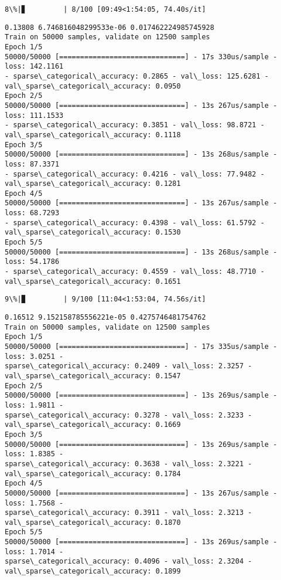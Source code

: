 \documentclass[11pt]{article}
\begin{document}
    \begin{Verbatim}[commandchars=\\\{\}]
  8\%|▊         | 8/100 [09:49<1:54:05, 74.40s/it]
    \end{Verbatim}

    \begin{Verbatim}[commandchars=\\\{\}]
0.13808 6.746816048299533e-06 0.017462224985745928
Train on 50000 samples, validate on 12500 samples
Epoch 1/5
50000/50000 [==============================] - 17s 330us/sample - loss: 142.1161
- sparse\_categorical\_accuracy: 0.2865 - val\_loss: 125.6281 -
val\_sparse\_categorical\_accuracy: 0.0950
Epoch 2/5
50000/50000 [==============================] - 13s 267us/sample - loss: 111.1533
- sparse\_categorical\_accuracy: 0.3851 - val\_loss: 98.8721 -
val\_sparse\_categorical\_accuracy: 0.1118
Epoch 3/5
50000/50000 [==============================] - 13s 268us/sample - loss: 87.3371
- sparse\_categorical\_accuracy: 0.4216 - val\_loss: 77.9482 -
val\_sparse\_categorical\_accuracy: 0.1281
Epoch 4/5
50000/50000 [==============================] - 13s 267us/sample - loss: 68.7293
- sparse\_categorical\_accuracy: 0.4398 - val\_loss: 61.5792 -
val\_sparse\_categorical\_accuracy: 0.1530
Epoch 5/5
50000/50000 [==============================] - 13s 268us/sample - loss: 54.1786
- sparse\_categorical\_accuracy: 0.4559 - val\_loss: 48.7710 -
val\_sparse\_categorical\_accuracy: 0.1651
    \end{Verbatim}

    \begin{Verbatim}[commandchars=\\\{\}]
  9\%|▉         | 9/100 [11:04<1:53:04, 74.56s/it]
    \end{Verbatim}

    \begin{Verbatim}[commandchars=\\\{\}]
0.16512 9.152158785556221e-05 0.4275746481754762
Train on 50000 samples, validate on 12500 samples
Epoch 1/5
50000/50000 [==============================] - 17s 335us/sample - loss: 3.0251 -
sparse\_categorical\_accuracy: 0.2409 - val\_loss: 2.3257 -
val\_sparse\_categorical\_accuracy: 0.1547
Epoch 2/5
50000/50000 [==============================] - 13s 269us/sample - loss: 1.9811 -
sparse\_categorical\_accuracy: 0.3278 - val\_loss: 2.3233 -
val\_sparse\_categorical\_accuracy: 0.1669
Epoch 3/5
50000/50000 [==============================] - 13s 269us/sample - loss: 1.8385 -
sparse\_categorical\_accuracy: 0.3638 - val\_loss: 2.3221 -
val\_sparse\_categorical\_accuracy: 0.1784
Epoch 4/5
50000/50000 [==============================] - 13s 267us/sample - loss: 1.7568 -
sparse\_categorical\_accuracy: 0.3911 - val\_loss: 2.3213 -
val\_sparse\_categorical\_accuracy: 0.1870
Epoch 5/5
50000/50000 [==============================] - 13s 269us/sample - loss: 1.7014 -
sparse\_categorical\_accuracy: 0.4096 - val\_loss: 2.3204 -
val\_sparse\_categorical\_accuracy: 0.1899
    \end{Verbatim}
\end{document}
